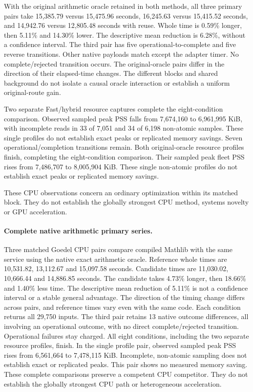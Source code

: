 \documentclass[10pt,twocolumn]{article}
\begin{document}
With the original arithmetic oracle retained in both methods, all three primary pairs take
15,385.79 versus 15,475.96 seconds, 16,245.63 versus 15,415.52 seconds, and
14,942.76 versus 12,805.48 seconds with reuse. Whole time is 0.59\% longer, then
5.11\% and 14.30\% lower. The descriptive mean reduction is 6.28\%, without a
confidence interval. The third pair has five operational-to-complete and five
reverse transitions. Other native payloads match except the adapter timer.
No complete/rejected transition occurs. The original-oracle pairs differ in the direction of their elapsed-time changes.
The different blocks and shared background do not isolate a causal oracle
interaction or establish a uniform original-route gain.

Two separate Fast/hybrid resource captures complete the eight-condition comparison. Observed sampled peak PSS falls from
7,674,160 to 6,961,995 KiB, with incomplete reads in 33 of 7,051 and 34 of
6,198 non-atomic samples. These single profiles do not establish exact peaks
or replicated memory savings. Seven operational/completion transitions remain.
Both original-oracle resource profiles finish, completing the eight-condition
comparison. Their sampled peak fleet PSS rises from 7,486,707 to 8,005,904 KiB.
These single non-atomic profiles do not establish exact peaks or replicated
memory savings.

These CPU observations concern an ordinary optimization within its matched
block. They do not establish the globally strongest CPU method, systems novelty
or GPU acceleration.

\paragraph{Complete native arithmetic primary series.}
Three matched Goedel CPU pairs compare compiled Mathlib with the same service
using the native exact arithmetic oracle. Reference whole times are
10,531.82, 13,112.67 and 15,097.58 seconds. Candidate times are
11,030.02, 10,666.44 and 14,886.85 seconds.
The candidate takes 4.73\% longer, then 18.66\% and 1.40\% less time.
The descriptive mean reduction of 5.11\% is not a confidence interval or a
stable general advantage. The direction of the timing change differs across pairs, and reference times vary even with the same code.
Each condition returns all 29,750 inputs. The third pair retains 13 native
outcome differences, all involving an operational outcome, with no direct
complete/rejected transition. Operational failures stay charged.
All eight conditions, including the two separate resource profiles, finish.
In the single profile pair, observed sampled peak PSS rises from 6,561,664 to
7,478,115 KiB. Incomplete, non-atomic sampling does not establish exact or
replicated peaks. This pair shows no measured memory saving.
These complete comparisons preserve a competent CPU competitor. They do not
establish the globally strongest CPU path or heterogeneous acceleration.
\end{document}

